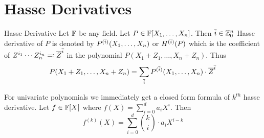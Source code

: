 \chapter{Hasse Derivatives}
\label{chap:hasse}

\begin{definition}{Hasse Derivative}{}
  Let $\mathbb{F}$ be any field. Let $P\in\mathbb{F}[X_1,\dots,X_n]$. Then $\overline{i}\in \mathbb{Z}_0^n$ Hasse derivative of $P$ is denoted by $P^{(\overline{i})}(X_1,\dots, X_n)$ or $H^{(\overline{i})}(P)$ which is the coefficient of $Z^{i_1}\cdots Z_n^{i_n}\eqqcolon \overline{Z}^{\overline{i}}$ in the polynomial  $P(X_1+Z_1,\dots, X_n+Z_n)$. Thus $$P(X_1+Z_1,\dots, X_n+Z_n)= \sum_{\overline{i}} P^{(\overline{i})}(X_1,\dots, X_n)\cdot \overline{Z}^{ \overline{i}}$$
\end{definition}

For univariate polynomials we immediately get a closed form formula of $k^{th}$ hasse derivative. Let $f\in\mathbb{F}[X]$ where $f(X)=\sum_{i=0}^da_iX^i$. Then $$f^{(k)}(X)=\sum_{i=0}^d \binom{k}{i}\cdot a_iX^{i-k}$$

